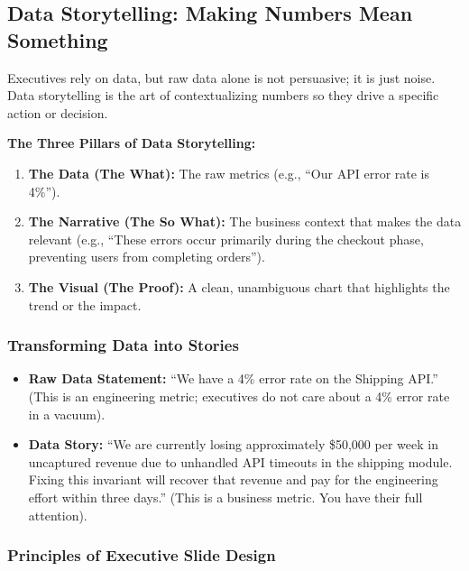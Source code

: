 \subsection{Data Storytelling: Making Numbers Mean
Something}\label{data-storytelling-making-numbers-mean-something}

Executives rely on data, but raw data alone is not persuasive; it is
just noise. Data storytelling is the art of contextualizing numbers so
they drive a specific action or decision.

\textbf{The Three Pillars of Data Storytelling:}

\begin{enumerate}
\def\labelenumi{\arabic{enumi}.}
\tightlist
\item
  \textbf{The Data (The What):} The raw metrics (e.g., ``Our API error
  rate is 4\%'').
\item
  \textbf{The Narrative (The So What):} The business context that makes
  the data relevant (e.g., ``These errors occur primarily during the
  checkout phase, preventing users from completing orders'').
\item
  \textbf{The Visual (The Proof):} A clean, unambiguous chart that
  highlights the trend or the impact.
\end{enumerate}

\subsubsection{Transforming Data into
Stories}\label{transforming-data-into-stories}

\begin{itemize}
\tightlist
\item
  \textbf{Raw Data Statement:} ``We have a 4\% error rate on the
  Shipping API.'' (This is an engineering metric; executives do not care
  about a 4\% error rate in a vacuum).
\item
  \textbf{Data Story:} ``We are currently losing approximately \$50,000
  per week in uncaptured revenue due to unhandled API timeouts in the
  shipping module. Fixing this invariant will recover that revenue and
  pay for the engineering effort within three days.'' (This is a
  business metric. You have their full attention).
\end{itemize}

\subsubsection{Principles of Executive Slide
Design}\label{principles-of-executive-slide-design}

